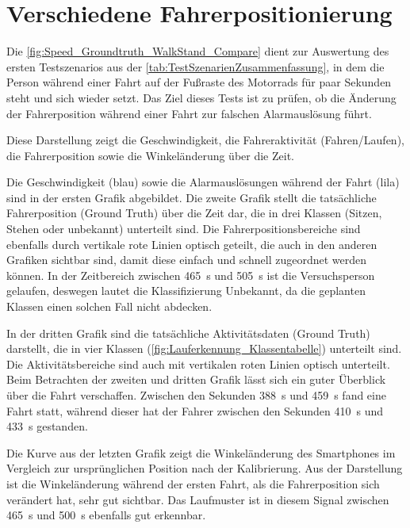\section{Verschiedene Fahrerpositionierung}
Die \autoref{fig:Speed_Groundtruth_WalkStand_Compare} dient zur Auswertung des ersten Testszenarios aus der \autoref{tab:TestSzenarienZusammenfassung}, in dem die Person während einer Fahrt auf der Fußraste des Motorrads für paar Sekunden steht und sich wieder setzt. Das Ziel dieses Tests ist zu prüfen, ob die Änderung der Fahrerposition während einer Fahrt zur falschen Alarmauslösung führt.

Diese Darstellung zeigt die Geschwindigkeit, die Fahreraktivität (Fahren/Laufen), die Fahrerposition sowie die Winkeländerung über die Zeit.

Die Geschwindigkeit (blau) sowie die Alarmauslösungen während der Fahrt (lila) sind in der ersten Grafik abgebildet.
Die zweite Grafik stellt die tatsächliche Fahrerposition (Ground Truth) über die Zeit dar, die in drei Klassen (Sitzen, Stehen oder unbekannt) unterteilt sind.
Die Fahrerpositionsbereiche sind ebenfalls durch vertikale rote Linien optisch geteilt, die auch in den anderen Grafiken sichtbar sind, damit diese einfach und schnell zugeordnet werden können.
In der Zeitbereich zwischen \SI{465}{\second} und \SI{505}{\second} ist die Versuchsperson gelaufen, deswegen lautet die Klassifizierung \glqq Unbekannt\grqq{}, da die geplanten Klassen einen solchen Fall nicht abdecken.

In der dritten Grafik sind die tatsächliche Aktivitätsdaten (Ground Truth) darstellt, die in vier Klassen (\autoref{fig:Lauferkennung_Klassentabelle}) unterteilt sind. Die Aktivitätsbereiche sind auch mit vertikalen roten Linien optisch unterteilt. Beim Betrachten der zweiten und dritten Grafik lässt sich ein guter Überblick über die Fahrt verschaffen. Zwischen den Sekunden \SI{388}{\second} und \SI{459}{\second} fand eine Fahrt statt, während dieser hat der Fahrer zwischen den Sekunden \SI{410}{\second} und \SI{433}{\second} gestanden.

Die Kurve aus der letzten Grafik zeigt die Winkeländerung des Smartphones im Vergleich zur ursprünglichen Position nach der Kalibrierung. Aus der Darstellung ist die Winkeländerung während der ersten Fahrt, als die Fahrerposition sich verändert hat, sehr gut sichtbar. Das Laufmuster ist in diesem Signal zwischen \SI{465}{\second} und \SI{500}{\second} ebenfalls gut erkennbar.

